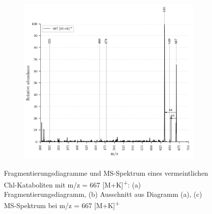 \begin{figure}[!htbp]
  \begin{subfigure}[b]{\textwidth}
    \includegraphics[width=\textwidth, height=0.5\textheight]{content/Anhang/MSLeafspray/RP_667/VWA_MS_LeafSpray_667.png}
    \caption{}
  \end{subfigure}
  
  \caption[Fragmentierungsdiagramme und MS-Spektrum eines vermeintlichen Chl-Kataboliten mit m/z = 667 Da, Quelle: Autor]{Fragmentierungsdiagramme und MS-Spektrum eines vermeintlichen Chl-Kataboliten mit m/z = 667 [M+K]\textsuperscript{+}: (a) Fragmentierungsdiagramm, (b) Ausschnitt aus Diagramm (a), (c) MS-Spektrum bei m/z = 667 [M+K]\textsuperscript{+}}
\end{figure}